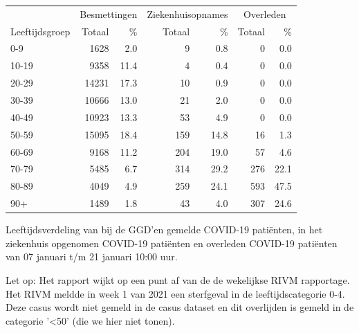 \documentclass[
  english,
  man,floatsintext]{apa6}
\begin{document}
\begin{table}[H]
\centering\begingroup\fontsize{11}{13}\selectfont

\begin{threeparttable}
\begin{tabular}{lrrrrrr}
\toprule
\multicolumn{1}{c}{ } & \multicolumn{2}{c}{Besmettingen} & \multicolumn{2}{c}{Ziekenhuisopnames} & \multicolumn{2}{c}{Overleden} \\
\cmidrule(l{3pt}r{3pt}){2-3} \cmidrule(l{3pt}r{3pt}){4-5} \cmidrule(l{3pt}r{3pt}){6-7}
Leeftijdsgroep & Totaal & \% & Totaal & \% & Totaal & \%\\
\midrule
0-9 & 1628 & 2.0 & 9 & 0.8 & 0 & 0.0\\
10-19 & 9358 & 11.4 & 4 & 0.4 & 0 & 0.0\\
20-29 & 14231 & 17.3 & 10 & 0.9 & 0 & 0.0\\
30-39 & 10666 & 13.0 & 21 & 2.0 & 0 & 0.0\\
40-49 & 10923 & 13.3 & 53 & 4.9 & 0 & 0.0\\
50-59 & 15095 & 18.4 & 159 & 14.8 & 16 & 1.3\\
60-69 & 9168 & 11.2 & 204 & 19.0 & 57 & 4.6\\
70-79 & 5485 & 6.7 & 314 & 29.2 & 276 & 22.1\\
80-89 & 4049 & 4.9 & 259 & 24.1 & 593 & 47.5\\
90+ & 1489 & 1.8 & 43 & 4.0 & 307 & 24.6\\
\bottomrule
\end{tabular}
\begin{tablenotes}
\item[1] Leeftijdsverdeling van bij de GGD’en gemelde COVID-19 patiënten, in het ziekenhuis opgenomen COVID-19 patiënten en overleden COVID-19 patiënten van 07 januari t/m 21 januari 10:00 uur.
\item[2] Let op: Het rapport wijkt op een punt af van de de wekelijkse RIVM rapportage. Het RIVM meldde in week 1 van 2021 een sterfgeval in de leeftijdscategorie 0-4. Deze casus wordt niet gemeld in de casus dataset en dit overlijden is gemeld in de categorie '<50' (die we hier niet tonen).
\end{tablenotes}
\end{threeparttable}
\endgroup{}
\end{table}

\newpage
\end{document}
